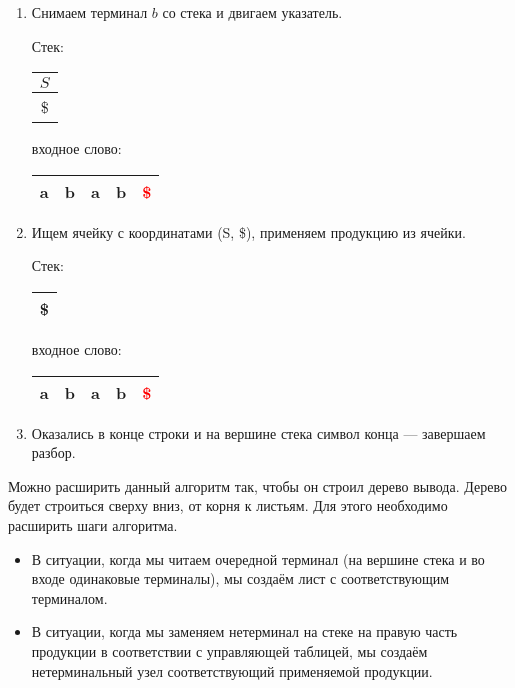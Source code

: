 \begin{example}
\begin{enumerate}
\item Снимаем терминал $b$ со стека и двигаем указатель.

    Стек: \,
    \begin{tabular}[c]{ |c| }
        \\ \hline
        $S$ \\ \hline
        \$ \\ \hline
    \end{tabular}
    \qquad  \qquad \qquad  \qquad входное слово: \,
    \begin{tabular}[c]{ |c|c|c|c|c| }
        \hline
        a & b & a & b & \textcolor{red}{\$} \\ \hline
    \end{tabular}

\item Ищем ячейку с координатами (S, \$), применяем продукцию из ячейки.

    Стек: \,
    \begin{tabular}[c]{ |c| }
        \\ \hline
        \$ \\ \hline
    \end{tabular}
    \qquad  \qquad \qquad  \qquad входное слово: \,
    \begin{tabular}[c]{ |c|c|c|c|c| }
        \hline
        a & b & a & b & \textcolor{red}{\$} \\ \hline
    \end{tabular}

\item Оказались в конце строки и на вершине стека символ конца --- завершаем разбор.

\end{enumerate}

\end{example}

Можно расширить данный алгоритм так, чтобы он строил дерево вывода. Дерево будет строиться сверху вниз, от корня к листьям. Для этого необходимо расширить шаги алгоритма.
\begin{itemize}
  \item В ситуации, когда мы читаем очередной терминал (на вершине стека и во входе одинаковые терминалы), мы создаём лист с соответствующим терминалом.
  \item В ситуации, когда мы заменяем нетерминал на стеке на правую часть продукции в соответствии с управляющей таблицей, мы создаём нетерминальный узел соответствующий применяемой продукции.
\end{itemize}

